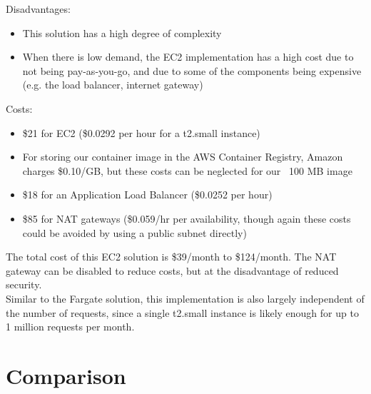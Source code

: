 Disadvantages:
\begin{itemize}
\item This solution has a high degree of complexity
\item When there is low demand, the EC2 implementation has a high cost due to not being pay-as-you-go, and due to some of the components being expensive (e.g. the load balancer, internet gateway)
\end{itemize}

Costs:
\begin{itemize}
\item \$21 for EC2 (\$0.0292 per hour for a t2.small instance)
\item For storing our container image in the AWS Container Registry, Amazon charges \$0.10/GB, but these costs can be neglected for our ~100 MB image
\item \$18 for an Application Load Balancer (\$0.0252 per hour)
\item \$85 for NAT gateways (\$0.059/hr per availability, though again these costs could be avoided by using a public subnet directly)
\end{itemize}

The total cost of this EC2 solution is \$39/month to \$124/month. The NAT gateway can be disabled to reduce costs, but at the disadvantage of reduced security.
\\[12pt]
Similar to the Fargate solution, this implementation is also largely independent of the number of requests, since a single t2.small instance is likely enough for up to 1 million requests per month.

\section{Comparison}


